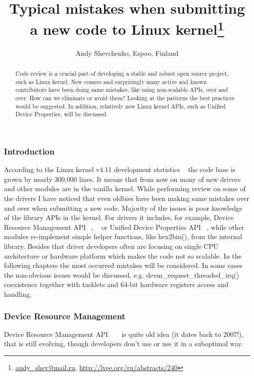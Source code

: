 \documentclass[10pt, a5paper]{article}
\begin{document}
\title{Typical mistakes when submitting a new code to Linux kernel\footnote{\url{andy_shev@mail.ru}, \url{http://lvee.org/ru/abstracts/240}}}
\author{Andy Shevchenko, Espoo, Finland}
\maketitle
\begin{abstract}
Code review is a crucial part of developing a stable and robust open source project, such as Linux kernel. New comers and surprisingly many active and known contributors have been doing same mistakes, like using non-scalable APIs, over and over. How can we eliminate or avoid them? Looking at the patterns the best practices would be suggested. In addition, relatively new Linux kernel APIs, such as Unified Device Properties, will be discussed.
\end{abstract}
\subsubsection*{Introduction}

According to the Linux kernel v4.11 development statistics ~\cite{Shevchenko1} the code base is grown by nearly 300,000 lines. It means that from now on many of new drivers and other modules are in the vanilla kernel. While performing review on some of the drivers I have noticed that even oldbies have been making same mistakes over and over when submitting a new code. Majority of the issues is poor knowledge of the library APIs in the kernel. For drivers it includes, for example, Device Resource Management API ~\cite{Shevchenko2}, ~\cite{Shevchenko3} or Unified Device Properties API ~\cite{Shevchenko4}, while other modules re-implement simple helper functions, like hex2bin(), from the internal library. Besides that driver developers often are focusing on single CPU architecture or hardware platform which makes the code not so scalable. In the following chapters the most occurred mistakes will be considered. In some cases the non-obvious issues would be discussed, e.g. devm\_request\_threaded\_irq() coexistence together with tasklets and 64-bit hardware registers access and handling.

\subsubsection*{Device Resource Management}

Device Resource Management API ~\cite{Shevchenko2} ~\cite{Shevchenko3} is quite old idea (it dates back to 2007!), that is still evolving, though developers don’t use or use it in a suboptimal way.
\end{document}

